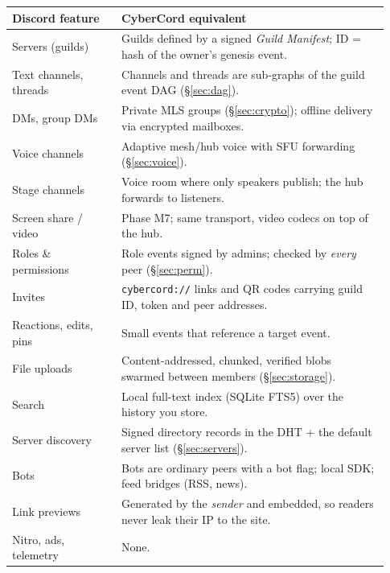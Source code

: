 \documentclass[11pt,a4paper]{article}
\begin{document}
\begin{longtable}{@{}p{0.27\linewidth}p{0.66\linewidth}@{}}
\toprule
\textbf{Discord feature} & \textbf{CyberCord equivalent} \\
\midrule
\endhead
Servers (guilds) & Guilds defined by a signed \emph{Guild Manifest}; ID = hash of the owner's genesis event. \\
Text channels, threads & Channels and threads are sub-graphs of the guild event DAG (\S\ref{sec:dag}). \\
DMs, group DMs & Private MLS groups (\S\ref{sec:crypto}); offline delivery via encrypted mailboxes. \\
Voice channels & Adaptive mesh/hub voice with SFU forwarding (\S\ref{sec:voice}). \\
Stage channels & Voice room where only speakers publish; the hub forwards to listeners. \\
Screen share / video & Phase M7; same transport, video codecs on top of the hub. \\
Roles \& permissions & Role events signed by admins; checked by \emph{every} peer (\S\ref{sec:perm}). \\
Invites & \texttt{cybercord://} links and QR codes carrying guild ID, token and peer addresses. \\
Reactions, edits, pins & Small events that reference a target event. \\
File uploads & Content-addressed, chunked, verified blobs swarmed between members (\S\ref{sec:storage}). \\
Search & Local full-text index (SQLite FTS5) over the history you store. \\
Server discovery & Signed directory records in the DHT + the default server list (\S\ref{sec:servers}). \\
Bots & Bots are ordinary peers with a bot flag; local SDK; feed bridges (RSS, news). \\
Link previews & Generated by the \emph{sender} and embedded, so readers never leak their IP to the site. \\
Nitro, ads, telemetry & None. \\
\bottomrule
\end{longtable}
\end{document}
